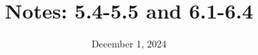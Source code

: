 \documentclass[fontsize=12pt, DIV=calc]{scrartcl}
\title{Notes: 5.4-5.5 and 6.1-6.4}
\date{December 1, 2024}
\begin{document}
\maketitle
\renewcommand{\arraystretch}{4}
\renewcommand{\cellalign}{l}
\end{document}
